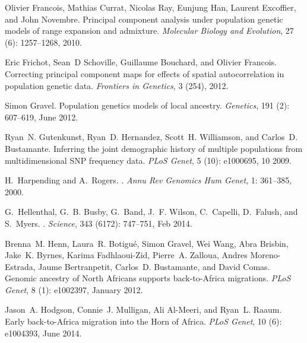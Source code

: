 \documentclass[10pt,letterpaper]{article}
\begin{document}
\begin{thebibliography}{80}
Olivier Francois, Mathias Currat, Nicolas Ray, Eunjung Han, Laurent Excoffier,
  and John Novembre.
\newblock Principal component analysis under population genetic models of range
  expansion and admixture.
\newblock \emph{Molecular Biology and Evolution}, 27 (6):
  1257--1268, 2010.

Eric Frichot, Sean~D Schoville, Guillaume Bouchard, and Olivier Francois.
\newblock Correcting principal component maps for effects of spatial
  autocorrelation in population genetic data.
\newblock \emph{Frontiers in Genetics}, 3 (254), 2012.

Simon Gravel.
\newblock Population genetics models of local ancestry.
\newblock \emph{Genetics}, 191 (2): 607--619, June 2012.

Ryan~N. Gutenkunst, Ryan~D. Hernandez, Scott~H. Williamson, and Carlos~D.
  Bustamante.
\newblock Inferring the joint demographic history of multiple populations from
  multidimensional {SNP} frequency data.
\newblock \emph{PLoS Genet}, 5 (10): e1000695, 10 2009.

H.~Harpending and A.~Rogers.
.
\newblock \emph{Annu Rev Genomics Hum Genet}, 1: 361--385, 2000.

G.~Hellenthal, G.~B. Busby, G.~Band, J.~F. Wilson, C.~Capelli, D.~Falush, and
  S.~Myers.
.
\newblock \emph{Science}, 343 (6172): 747--751, Feb 2014.

Brenna~M. Henn, Laura~R. Botigué, Simon Gravel, Wei Wang, Abra Brisbin,
  Jake~K. Byrnes, Karima Fadhlaoui-Zid, Pierre~A. Zalloua, Andres
  Moreno-Estrada, Jaume Bertranpetit, Carlos~D. Bustamante, and David Comas.
\newblock Genomic ancestry of {North} {Africans} supports back-to-{Africa}
  migrations.
\newblock \emph{{PLoS} Genet}, 8 (1): e1002397, January 2012.

Jason~A. Hodgson, Connie~J. Mulligan, Ali Al-Meeri, and Ryan~L. Raaum.
\newblock Early back-to-{Africa} migration into the {Horn} of {Africa}.
\newblock \emph{{PLoS} Genet}, 10 (6): e1004393, June 2014.


\end{thebibliography}
\end{document}
